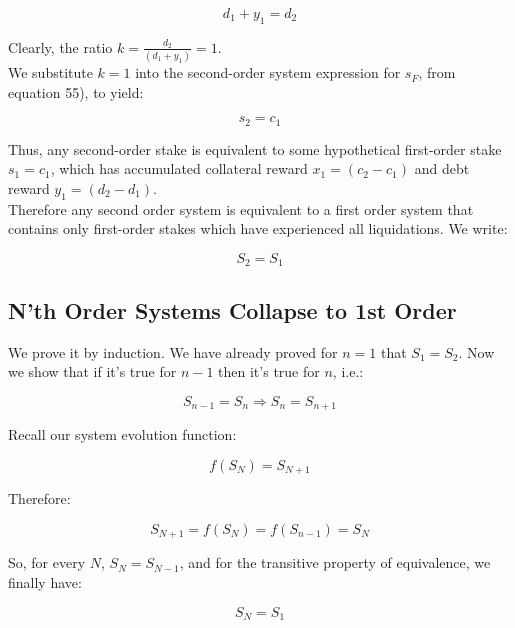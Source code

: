 \documentclass[reqno]{article}
\begin{document}
\begin{equation} 
    d_1+y_1=d_2
\end{equation}

\bigskip
Clearly, the ratio  $k = \frac{d_2}{(d_1+y_1)} = 1$.\\

We substitute $k=1$ into the second-order system expression for $s_F$, from equation 55), to yield:

\begin{equation} 
    s_2=c_1
\end{equation}

\bigskip
Thus, any second-order stake is equivalent to some hypothetical first-order stake $s_1=c_1$, which has accumulated collateral reward $x_1=(c_2-c_1)$ and debt reward $y_1=(d_2-d_1)$.\\

Therefore any second order system is equivalent to a first order system that contains only first-order stakes which have experienced all liquidations. We write:

\begin{equation} 
    S_2=S_1
\end{equation}

\subsection{N’th Order Systems Collapse to 1st Order}
We prove it by induction. We have already proved for $n=1$ that $S_1=S_2$.
Now we show that if it’s true for $n-1$ then it’s true for $n$, i.e.:

\begin{equation}
    S_{n-1} = S_n \Rightarrow S_n = S_{n+1}
\end{equation}

Recall our system evolution function: 

\begin{equation} 
    f(S_N)=S_{N+1}
\end{equation}

Therefore:

\begin{equation} 
    S_{N+1} = f(S_N) = f(S_{n-1}) = S_N
\end{equation}

\bigskip
So, for every $N$, $S_N = S_{N-1}$, and for the transitive property of equivalence, we finally have:

\begin{equation}
    S_N=S_1
\end{equation}
\end{document}
